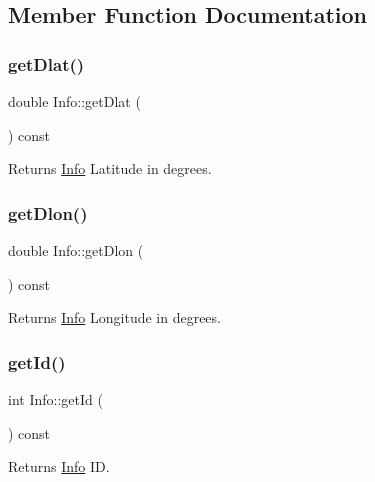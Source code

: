\subsection{Member Function Documentation}
\mbox{\label{class_info_ab7a047fbb1967753eb0b55b13be17bd7}} 
\subsubsection{\texorpdfstring{get\+Dlat()}{getDlat()}}
{\footnotesize\ttfamily double Info\+::get\+Dlat (\begin{DoxyParamCaption}{ }\end{DoxyParamCaption}) const}

\begin{DoxyReturn}{Returns}
\hyperlink{class_info}{Info} Latitude in degrees. 
\end{DoxyReturn}
\mbox{\label{class_info_a478165d200d4c8fc8d16c030d6653f0f}} 
\subsubsection{\texorpdfstring{get\+Dlon()}{getDlon()}}
{\footnotesize\ttfamily double Info\+::get\+Dlon (\begin{DoxyParamCaption}{ }\end{DoxyParamCaption}) const}

\begin{DoxyReturn}{Returns}
\hyperlink{class_info}{Info} Longitude in degrees. 
\end{DoxyReturn}
\mbox{\label{class_info_ab534c4bfb1ce63dc2ce89e147130a67a}} 
\subsubsection{\texorpdfstring{get\+Id()}{getId()}}
{\footnotesize\ttfamily int Info\+::get\+Id (\begin{DoxyParamCaption}{ }\end{DoxyParamCaption}) const}

\begin{DoxyReturn}{Returns}
\hyperlink{class_info}{Info} ID. 
\end{DoxyReturn}
\mbox{\label{class_info_ad2b2c037bdb95007e331dc1167cd0d10}} 

